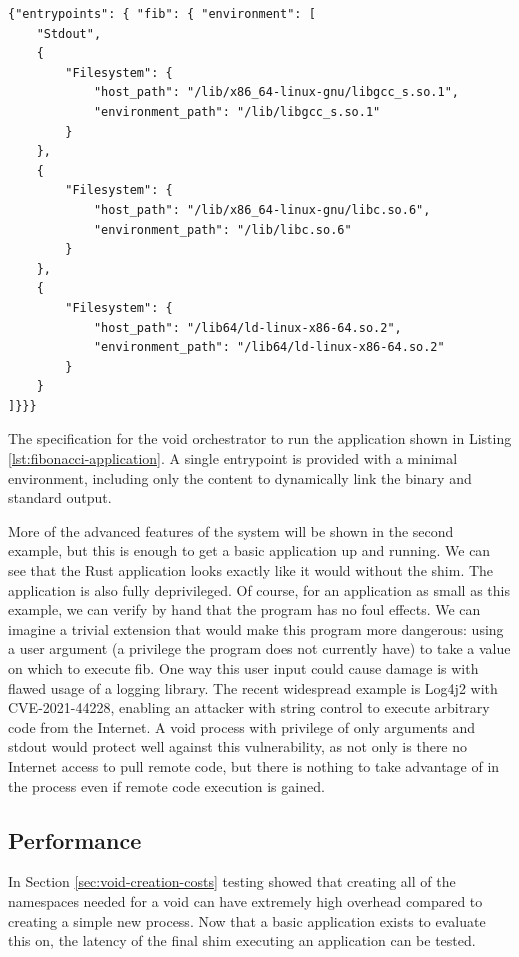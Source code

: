 \documentclass[12pt,a4paper,twoside]{report}
\begin{document}
\begin{listing}
\begin{verbatim}
{"entrypoints": { "fib": { "environment": [
    "Stdout",
    {
        "Filesystem": {
            "host_path": "/lib/x86_64-linux-gnu/libgcc_s.so.1",
            "environment_path": "/lib/libgcc_s.so.1"
        }
    },
    {
        "Filesystem": {
            "host_path": "/lib/x86_64-linux-gnu/libc.so.6",
            "environment_path": "/lib/libc.so.6"
        }
    },
    {
        "Filesystem": {
            "host_path": "/lib64/ld-linux-x86-64.so.2",
            "environment_path": "/lib64/ld-linux-x86-64.so.2"
        }
    }
]}}}
\end{verbatim}

\caption{The specification for the void orchestrator to run the application shown in Listing \ref{lst:fibonacci-application}. A single entrypoint is provided with a minimal environment, including only the content to dynamically link the binary and standard output.}
\label{lst:fibonacci-application-spec}
\end{listing}

More of the advanced features of the system will be shown in the second example, but this is enough to get a basic application up and running. We can see that the Rust application looks exactly like it would without the shim. The application is also fully deprivileged. Of course, for an application as small as this example, we can verify by hand that the program has no foul effects. We can imagine a trivial extension that would make this program more dangerous: using a user argument (a privilege the program does not currently have) to take a value on which to execute fib. One way this user input could cause damage is with flawed usage of a logging library. The recent widespread example is Log4j2 with CVE-2021-44228, enabling an attacker with string control to execute arbitrary code from the Internet. A void process with privilege of only arguments and stdout would protect well against this vulnerability, as not only is there no Internet access to pull remote code, but there is nothing to take advantage of in the process even if remote code execution is gained.

\subsection{Performance}
\label{sec:fib-performance}

In Section \ref{sec:void-creation-costs} testing showed that creating all of the namespaces needed for a void can have extremely high overhead compared to creating a simple new process. Now that a basic application exists to evaluate this on, the latency of the final shim executing an application can be tested.
\end{document}
